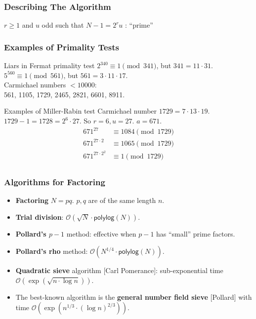 \begin{frame}\frametitle{Describing The Algorithm}
\begin{algorithm}[H]
\DontPrintSemicolon
\caption{The Miller-Rabin primality test}
\BlankLine

\KwC $r\ge 1$ and $u$ odd such that $N-1 = 2^ru$\;
\KwL: 
\Return ``prime''
\end{algorithm}
\end{frame}
\begin{frame}\frametitle{Examples of Primality Tests}
\begin{exampleblock}{Liars in Fermat primality test}
$2^{340} \equiv 1 \pmod {341}$,  but $341 = 11\cdot 31$.\\  
$5^{560} \equiv 1 \pmod {561}$,  but $561 = 3\cdot 11\cdot 17$.\\
Carmichael numbers $< 10000$: \\  
561,  1105,  1729,  2465,  2821,  6601,  8911.
\end{exampleblock}
\begin{exampleblock}{Examples of Miller-Rabin test}
Carmichael number $1729=7\cdot 13\cdot 19$. \\$1729-1 = 1728 = 2^6\cdot 27$. So $r = 6, u = 27$. $a=671$.
\begin{align*}
671^{27} &\equiv 1084 \pmod {1729} \\
671^{27\cdot 2} &\equiv 1065 \pmod {1729}\\
671^{27\cdot 2^2} &\equiv 1 \pmod {1729}\\
\end{align*}

\end{exampleblock}
\end{frame}
\begin{frame}\frametitle{Algorithms for Factoring}
\begin{itemize}
\item \textbf{Factoring} $N=pq$. $p,q$ are of the same length $n$.
\item \textbf{Trial division}: $\mathcal{O}(\sqrt{N}\cdot \mathsf{polylog}(N))$.
\item \textbf{Pollard's $p-1$} method: effective when $p-1$ has ``small'' prime factors.
\item \textbf{Pollard's rho} method: $\mathcal{O}(N^{1/4}\cdot \mathsf{polylog}(N))$.
\item \textbf{Quadratic sieve} algorithm [Carl Pomerance]: sub-exponential time $\mathcal{O}(\exp(\sqrt{n\cdot \log n}))$.
\item The best-known algorithm is the \textbf{general number field sieve} [Pollard] with time $\mathcal{O}(\exp(n^{1/3}\cdot(\log n)^{2/3}))$.
\end{itemize}
\end{frame}
